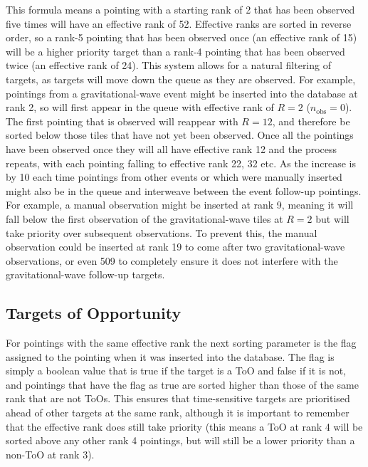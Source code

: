 \begin{colsection}
\begin{colsection}
This formula means a pointing with a starting rank of 2 that has been observed five times will have an effective rank of 52. Effective ranks are sorted in reverse order, so a rank-5 pointing that has been observed once (an effective rank of 15) will be a higher priority target than a rank-4 pointing that has been observed twice (an effective rank of 24). This system allows for a natural filtering of targets, as targets will move down the queue as they are observed. For example, pointings from a gravitational-wave event might be inserted into the database at rank 2, so will first appear in the queue with effective rank of $R=2$ ($n_\text{obs}=0$). The first pointing that is observed will reappear with $R=12$, and therefore be sorted below those tiles that have not yet been observed. Once all the pointings have been observed once they will all have effective rank 12 and the process repeats, with each pointing falling to effective rank 22, 32 etc. As the increase is by 10 each time pointings from other events or which were manually inserted might also be in the queue and interweave between the event follow-up pointings. For example, a manual observation might be inserted at rank 9, meaning it will fall below the first observation of the gravitational-wave tiles at $R=2$ but will take priority over subsequent observations. To prevent this, the manual observation could be inserted at rank 19 to come after two gravitational-wave observations, or even 509 to completely ensure it does not interfere with the gravitational-wave follow-up targets.

\end{colsection}

\subsection{Targets of Opportunity}
\label{sec:toos}
\begin{colsection}

For pointings with the same effective rank the next sorting parameter is the  flag assigned to the pointing when it was inserted into the database. The flag is simply a boolean value that is true if the target is a ToO and false if it is not, and pointings that have the flag as true are sorted higher than those of the same rank that are not ToOs. This ensures that time-sensitive targets are prioritised ahead of other targets at the same rank, although it is important to remember that the effective rank does still take priority (this means a ToO at rank 4 will be sorted above any other rank 4 pointings, but will still be a lower priority than a non-ToO at rank 3).


\end{colsection}
\end{colsection}
